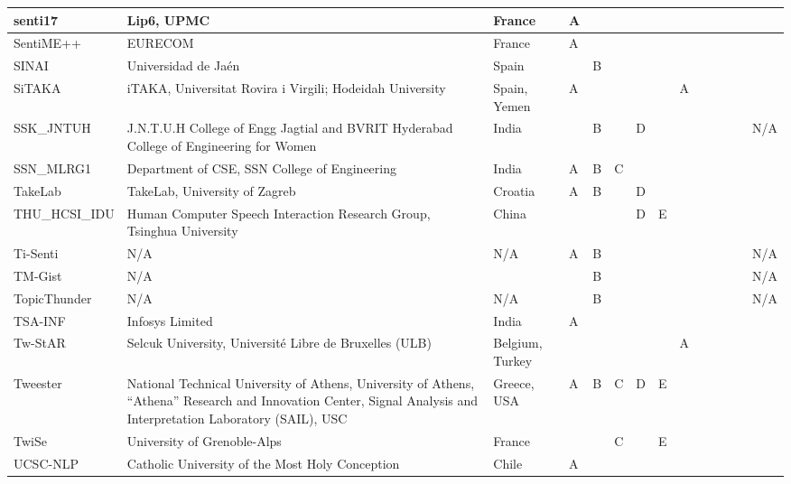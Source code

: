 \begin{table}[h!]
\begin{scriptsize}
\begin{tabular}{|l|p{4.5cm}|p{1.8cm} | lllll | lllll |p{3.8cm}|}
senti17	&	Lip6, UPMC	&	France	&	A	&		&		&		&		&		&		&		&		&		&	\cite{SemEval:2017:task4:Senti17}\\
\hline
SentiME++	&	EURECOM	&	France	&	A	&		&		&		&		&		&		&		&		&		&	\cite{SemEval:2017:task4:SentiME++} \\
\hline
SINAI	&	Universidad de Ja\'{e}n	&	Spain	&		&	B  &		&		&		&		&		&		&		&		&	\cite{SemEval:2017:task4:sinai} \\
\hline
SiTAKA	&	iTAKA, Universitat Rovira i Virgili; Hodeidah University	&	Spain, Yemen	&	A	&		&		&		&		&	A	&		&		&		&		&	\cite{SemEval:2017:task4:SiTAKA} \\
\hline
SSK\_JNTUH	&	J.N.T.U.H College of Engg Jagtial and BVRIT Hyderabad College of Engineering for Women	&	India	&		&	B	&		&	D	&		&		&		&		&		&		&	N/A	\\
\hline
SSN\_MLRG1	&	Department of CSE, SSN College of Engineering	&	India	&	A	&	B	&	C	&		&		&		&		&		&		&		&	\cite{SemEval:2017:task4:ssn_mlrg1} \\
\hline
TakeLab	&	TakeLab, University of Zagreb	&	Croatia	&	A	&	B	&		&	D	&		&		&		&		&		&		&	\cite{SemEval:2017:task4:takelab} \\
\hline
THU\_HCSI\_IDU	&	Human Computer Speech Interaction Research Group, Tsinghua University	&	China	&		&		&		&	D	&	E	&		&		&		&		&		&		\\
\hline
Ti-Senti	&	N/A	&	N/A	&	A	&	B	&		&		&		&		&		&		&		&		&	N/A \\
\hline
TM-Gist	&	N/A	&		&		&	B	&		&		&		&		&		&		&		&		&	N/A	\\
\hline
TopicThunder	&	N/A	&	N/A	&		&	B	&		&		&		&		&		&		&		&		&	N/A \\
\hline
TSA-INF	&	Infosys Limited	&	India	&	A	&		&		&		&		&		&		&		&		&		&	\cite{SemEval:2017:task4:tsa-inf}	\\
\hline
Tw-StAR	&	Selcuk University, Université Libre de Bruxelles (ULB)	&	Belgium, Turkey	&		&		&		&		&		&	A	&		&		&		&		&	\cite{SemEval:2017:task4:1w-StAr} \\
\hline
Tweester	&	National Technical University of Athens, University of Athens, ``Athena'' Research and Innovation Center, Signal Analysis and Interpretation Laboratory (SAIL), USC	&	Greece, USA	&	A	&	B	&	C	&	D	&	E	&		&		&		&		&		&	\cite{SemEval:2017:task4:Tweester} \\
\hline
TwiSe	&	University of Grenoble-Alps	&	France	&		&		&	C	&		&	E	&		&		&		&		&		&	\cite{SemEval:2017:task4:twise} \\
\hline
UCSC-NLP	&	Catholic University of the Most Holy Conception	&	Chile	&	A	&		&		&		&		&		&		&		&		&		&	\cite{SemEval:2017:task4:ucsc-nlp}\\

\end{tabular}
\end{scriptsize}
\end{table}
